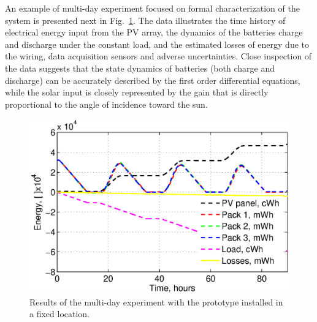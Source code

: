 \documentclass{ifacconf}
\newcommand{\squeezeup}{\vspace{-3.0mm}}
\begin{document}
An example of multi-day experiment focused on formal characterization of the
system is presented next in Fig.~\ref{fig:MultiDay_enrg}. The data
illustrates the time history of electrical energy input from the PV array,
the dynamics of the batteries charge and discharge under the constant load,
and the estimated losses of energy due to the wiring, data acquisition
sensors and adverse uncertainties. Close inspection of the data suggests that
the state dynamics of batteries (both charge and discharge) can be accurately
described by the first order differential equations, while the solar input is
closely represented by the gain that is directly proportional to the angle of
incidence toward the sun.
\begin{figure}[thpb]
  \centering
  \includegraphics[scale=0.5]{Figures/MultiDay_energy_2.eps}
  \caption{Results of the multi-day experiment with the prototype
  installed in a fixed location.}
  \label{fig:MultiDay_enrg}
\end{figure}
\squeezeup
\end{document}
